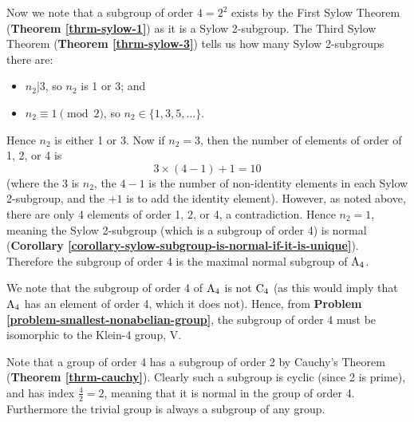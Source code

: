 \begin{enumerate}
    Now we note that a subgroup of order $4 = 2^2$ exists by the First Sylow Theorem (\textbf{Theorem \ref{thrm-sylow-1}}) as it is a Sylow 2-subgroup. The Third Sylow Theorem (\textbf{Theorem \ref{thrm-sylow-3}}) tells us how many Sylow 2-subgroups there are:
    \begin{itemize}
        \item $n_2 \vert 3$, so $n_2$ is 1 or 3; and
        \item $n_2 \equiv 1 \pmod2$, so $n_2 \in \{1, 3, 5, \dots\}$.
    \end{itemize}
    Hence $n_2$ is either 1 or 3. Now if $n_2 = 3$, then the number of elements of order of 1, 2, or 4 is
    \[
        3 \times (4 - 1) + 1 = 10
    \]
    (where the 3 is $n_2$, the $4-1$ is the number of non-identity elements in each Sylow 2-subgroup, and the $+1$ is to add the identity element). However, as noted above, there are only 4 elements of order 1, 2, or 4, a contradiction. Hence $n_2 = 1$, meaning the Sylow 2-subgroup (which is a subgroup of order 4) is normal (\textbf{Corollary \ref{corollary-sylow-subgroup-is-normal-if-it-is-unique}}). Therefore the subgroup of order 4 is the maximal normal subgroup of $\mathrm{A}_{4}$.
    
    We note that the subgroup of order 4 of $\mathrm{A}_{4}$ is not $\mathrm{C}_{4}$ (as this would imply that $\mathrm{A}_{4}$ has an element of order 4, which it does not). Hence, from \textbf{Problem \ref{problem-smallest-nonabelian-group}}, the subgroup of order 4 must be isomorphic to the Klein-4 group, $\mathrm{V}$.
    
    Note that a group of order 4 has a subgroup of order 2 by Cauchy's Theorem (\textbf{Theorem \ref{thrm-cauchy}}). Clearly such a subgroup is cyclic (since 2 is prime), and has index $\frac42 = 2$, meaning that it is normal in the group of order 4. Furthermore the trivial group is always a subgroup of any group.
    

\end{enumerate}
